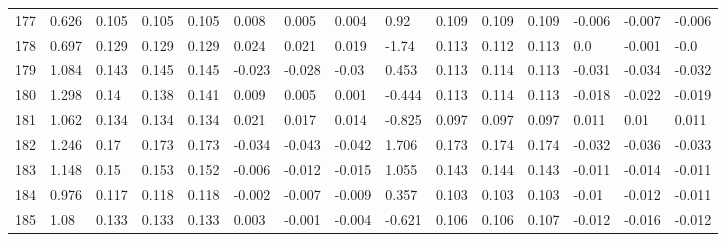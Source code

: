 \begin{table}
\begin{tabular}{|l|l|lll|lll|l|lll|lll}
		177 & 0.626 & 0.105 & 0.105 & 0.105 & 0.008 & 0.005 & 0.004 & 0.92 & 0.109 & 0.109 & 0.109 & -0.006 & -0.007 & -0.006 \\
		178 & 0.697 & 0.129 & 0.129 & 0.129 & 0.024 & 0.021 & 0.019 & -1.74 & 0.113 & 0.112 & 0.113 & 0.0 & -0.001 & -0.0 \\
		179 & 1.084 & 0.143 & 0.145 & 0.145 & -0.023 & -0.028 & -0.03 & 0.453 & 0.113 & 0.114 & 0.113 & -0.031 & -0.034 & -0.032 \\
		180 & 1.298 & 0.14 & 0.138 & 0.141 & 0.009 & 0.005 & 0.001 & -0.444 & 0.113 & 0.114 & 0.113 & -0.018 & -0.022 & -0.019 \\
		181 & 1.062 & 0.134 & 0.134 & 0.134 & 0.021 & 0.017 & 0.014 & -0.825 & 0.097 & 0.097 & 0.097 & 0.011 & 0.01 & 0.011 \\
		182 & 1.246 & 0.17 & 0.173 & 0.173 & -0.034 & -0.043 & -0.042 & 1.706 & 0.173 & 0.174 & 0.174 & -0.032 & -0.036 & -0.033 \\
		183 & 1.148 & 0.15 & 0.153 & 0.152 & -0.006 & -0.012 & -0.015 & 1.055 & 0.143 & 0.144 & 0.143 & -0.011 & -0.014 & -0.011 \\
		184 & 0.976 & 0.117 & 0.118 & 0.118 & -0.002 & -0.007 & -0.009 & 0.357 & 0.103 & 0.103 & 0.103 & -0.01 & -0.012 & -0.011 \\
		185 & 1.08 & 0.133 & 0.133 & 0.133 & 0.003 & -0.001 & -0.004 & -0.621 & 0.106 & 0.106 & 0.107 & -0.012 & -0.016 & -0.012 
	\end{tabular}
	
\end{table}
